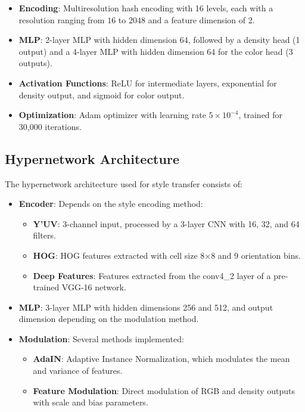 \begin{itemize}
    \item \textbf{Encoding}: Multiresolution hash encoding with 16 levels, each with a resolution ranging from $16$ to $2048$ and a feature dimension of 2.
    
    \item \textbf{MLP}: 2-layer MLP with hidden dimension 64, followed by a density head (1 output) and a 4-layer MLP with hidden dimension 64 for the color head (3 outputs).
    
    \item \textbf{Activation Functions}: ReLU for intermediate layers, exponential for density output, and sigmoid for color output.
    
    \item \textbf{Optimization}: Adam optimizer with learning rate $5 \times 10^{-4}$, trained for 30,000 iterations.
\end{itemize}

\subsection{Hypernetwork Architecture}
The hypernetwork architecture used for style transfer consists of:

\begin{itemize}
    \item \textbf{Encoder}: Depends on the style encoding method:
    \begin{itemize}
        \item \textbf{Y'UV}: 3-channel input, processed by a 3-layer CNN with 16, 32, and 64 filters.
        \item \textbf{HOG}: HOG features extracted with cell size 8×8 and 9 orientation bins.
        \item \textbf{Deep Features}: Features extracted from the conv4\_2 layer of a pre-trained VGG-16 network.
    \end{itemize}
    
    \item \textbf{MLP}: 3-layer MLP with hidden dimensions 256 and 512, and output dimension depending on the modulation method.
    
    \item \textbf{Modulation}: Several methods implemented:
    \begin{itemize}
        \item \textbf{AdaIN}: Adaptive Instance Normalization, which modulates the mean and variance of features.
        \item \textbf{Feature Modulation}: Direct modulation of RGB and density outputs with scale and bias parameters.
    \end{itemize}
\end{itemize}

